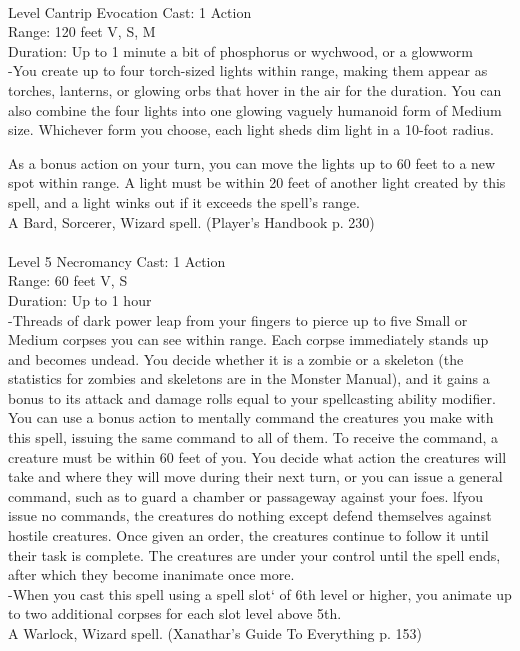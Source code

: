 \documentclass[10pt,twocolumn]{report}
\begin{document}
 \\
Level Cantrip \quad Evocation \quad Cast: 1 Action\\
Range: 120 feet \quad V, S, M \\
Duration: Up to 1 minute \quad a bit of phosphorus or wychwood, or a glowworm\\
-You create up to four torch-sized lights within range, making them appear as torches, lanterns, or glowing orbs that hover in the air for the duration. 
You can also combine the four lights into one glowing vaguely humanoid form of Medium size. Whichever form you choose, each light sheds dim light in a 10-foot radius. 

As a bonus action on your turn, you can move the lights up to 60 feet to a new spot within range. A light must be within 20 feet of another light created by this spell, and a light winks out if it exceeds the spell’s range.\\
A Bard, Sorcerer, Wizard spell. (Player's Handbook p. 230) \\


 \\
Level 5 \quad Necromancy \quad Cast: 1 Action\\
Range: 60 feet \quad V, S\\
Duration: Up to 1 hour \quad \\
-Threads of dark power leap from your fingers to pierce up to five Small or Medium corpses you can see within range. Each corpse immediately stands up and becomes undead. You decide whether it is a zombie or a skeleton (the statistics for zombies and skeletons are in the Monster Manual), and it gains a bonus to its attack and damage rolls equal to your spellcasting ability modifier. You can use a bonus action to mentally command the creatures you make with this spell, issuing the same command to all of them. To receive the command, a creature must be within 60 feet of you. You decide what action the creatures will take and where they will move during their next turn, or you can issue a general command, such as to guard a chamber or passageway against your foes. lfyou issue no commands, the creatures do nothing except defend themselves against hostile creatures. Once given an order, the creatures continue to follow it until their task is complete.
The creatures are under your control until the spell ends, after which they become inanimate once more.\\
-When you cast this spell using a spell slot‘ of 6th level or higher, you animate up to two additional corpses for each slot level above 5th.\\
A Warlock, Wizard spell. (Xanathar's Guide To Everything p. 153) \\
\end{document}
